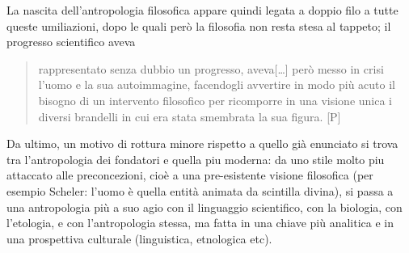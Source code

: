 \documentclass[dvipsnames]{amsart}
\begin{document}
La nascita dell'antropologia filosofica appare quindi legata a doppio filo a tutte queste umiliazioni, dopo le quali però la filosofia non resta stesa al tappeto; il progresso scientifico aveva
\begin{quote}
  rappresentato senza dubbio un progresso, aveva[\dots\unkern] però messo in crisi l'uomo e la sua
autoimmagine, facendogli avvertire in modo più acuto il bisogno di un intervento filosofico per ricomporre in una visione unica i diversi brandelli in cui era stata smembrata la sua figura. \hspace{\fill} [P]
\end{quote}
Da ultimo, un motivo di rottura minore rispetto a quello già enunciato si trova tra l'antropologia dei fondatori e quella piu moderna: da uno stile molto piu attaccato alle preconcezioni, cioè a una pre-esistente visione filosofica (per esempio Scheler: l'uomo è quella entità animata da scintilla divina), si passa a una antropologia più a suo agio con il linguaggio scientifico, con la biologia, con l'etologia, e con l'antropologia stessa, ma fatta in una chiave più analitica e in una prospettiva culturale (linguistica, etnologica etc).
\end{document}
